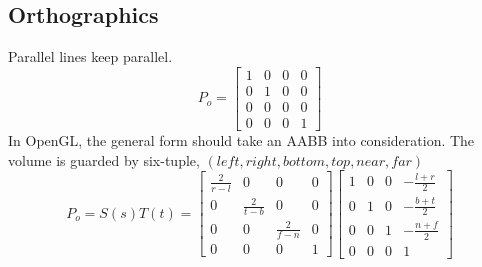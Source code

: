 \documentclass{article}
\begin{document}
\subsection*{Orthographics}
Parallel lines keep parallel.
\[P_{o } = \begin{bmatrix}
    1 &0 &0 &0 \\
    0 &1 &0 &0 \\
    0 &0 &0 &0 \\
    0 &0 &0 &1
\end{bmatrix}\]
In OpenGL, the general form should take an AABB into consideration.
The volume is guarded by six-tuple, \((left, right, bottom, top, near, far)\)
\[P_{o } = S(s)T(t)= \begin{bmatrix}
    \frac{2}{r-l} &0 &0 &0 \\
    0 &\frac{2}{t-b} &0 &0 \\
    0 &0 &\frac{2}{f-n} &0 \\
    0 &0 &0 &1
\end{bmatrix}\begin{bmatrix}
    1 &0 &0 &-\frac{l+r}{2} \\
    0 &1 &0 &-\frac{b+t}{2} \\
    0 &0 &1 &-\frac{n+f}{2} \\
    0 &0 &0 &1
\end{bmatrix}\]
\end{document}
